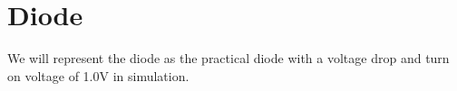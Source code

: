 \section{Diode}

We will represent the diode as the practical diode with a voltage drop and turn on voltage of 1.0V in simulation.